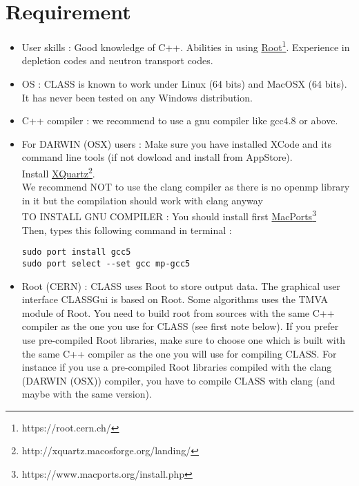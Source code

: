 \section{Requirement}
\begin{center}
\begin{minipage}{\textwidth}
\begin{itemize}
\item User skills : Good knowledge of C++. Abilities in using \href{https://root.cern.ch/}{Root}\footnote{https://root.cern.ch/}.
Experience in depletion codes and neutron transport codes.
\item OS : CLASS is known to work under Linux (64  bits) and MacOSX (64 bits). It  has never been tested on any Windows distribution.
\item C++ compiler :  we recommend to use a gnu compiler like gcc4.8 or above.
\item For DARWIN (OSX) users : 
Make sure you have installed XCode and its command line tools (if not dowload and install from AppStore).\\ 
Install \href{http://xquartz.macosforge.org/landing/}{XQuartz}\footnote{http://xquartz.macosforge.org/landing/}.\\
We recommend NOT to use the clang compiler as there is no openmp library in it but the compilation should work with clang anyway\\
TO INSTALL GNU COMPILER : You should install first \href{https://www.macports.org/install.php}{MacPorts}\footnote{https://www.macports.org/install.php} \\
Then, types this following command in terminal :\\
\begin{lstlisting}[style=terminal]
sudo port install gcc5
sudo port select --set gcc mp-gcc5
\end{lstlisting}
\item Root (CERN) :  
CLASS uses Root to store output data. 
The graphical user interface CLASSGui is based on Root.
Some algorithms uses the TMVA module of Root. You need to build root from sources with the same C++ compiler as the one you use for CLASS (see first note below). If you prefer use pre-compiled Root libraries, make sure to choose one which is built with the same C++ compiler as the one you will use for compiling CLASS.
For instance if you use a pre-compiled Root libraries compiled with the clang (DARWIN (OSX)) compiler, you have to compile CLASS with clang (and maybe with the same version). 

\end{itemize}
\end{minipage}
\end{center}

